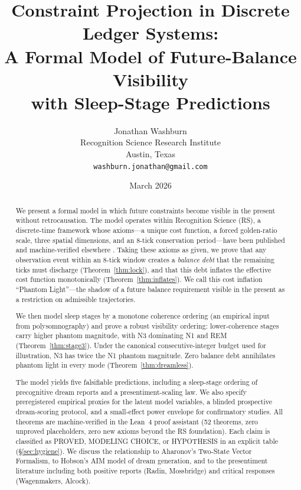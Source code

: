\documentclass[11pt, a4paper]{article}
\title{\textbf{Constraint Projection in Discrete Ledger Systems:\\
A Formal Model of Future-Balance Visibility\\
with Sleep-Stage Predictions}}
\author{Jonathan Washburn\\
Recognition Science Research Institute\\
Austin, Texas\\
\texttt{washburn.jonathan@gmail.com}}
\date{March 2026}
\theoremstyle{definition}
\theoremstyle{remark}
\begin{document}
\maketitle

\begin{abstract}
We present a formal model in which future constraints become visible
in the present without retrocausation. The model operates within
Recognition Science (RS), a discrete-time framework whose axioms---a
unique cost function, a forced golden-ratio scale, three spatial
dimensions, and an 8-tick conservation period---have been published
and machine-verified elsewhere \cite{RSAxioms2025,RSCost2025,
RSGeometry2025,RSdalembert2026}. Taking these axioms as given, we
prove that any observation event within an 8-tick window creates a
\emph{balance debt} that the remaining ticks must discharge
(Theorem~\ref{thm:lock}), and that this debt inflates the effective
cost function monotonically (Theorem~\ref{thm:inflates}). We call
this cost inflation ``Phantom Light''---the shadow of a future
balance requirement visible in the present as a restriction on
admissible trajectories.

We then model sleep stages by a monotone coherence ordering (an
empirical input from polysomnography) and prove a robust visibility
ordering: lower-coherence stages carry higher phantom magnitude, with
N3 dominating N1 and REM (Theorem~\ref{thm:stage3}). Under the
canonical consecutive-integer budget used for illustration, N3 has
twice the N1 phantom magnitude. Zero balance debt annihilates phantom
light in every mode (Theorem~\ref{thm:dreamless}).

The model yields five falsifiable predictions, including a
sleep-stage ordering of precognitive dream reports and a
presentiment-scaling law. We also specify preregistered empirical
proxies for the latent model variables, a blinded prospective
dream-scoring protocol, and a small-effect power envelope for
confirmatory studies. All theorems are machine-verified in the Lean~4
proof assistant (52 theorems, zero unproved placeholders, zero new
axioms beyond the RS foundation). Each claim is classified as PROVED,
MODELING CHOICE, or HYPOTHESIS in an explicit table
(\S\ref{sec:hygiene}). We discuss the relationship to
Aharonov's Two-State Vector Formalism, to Hobson's AIM model of
dream generation, and to the presentiment literature including
both positive reports (Radin, Mossbridge) and critical responses
(Wagenmakers, Alcock).
\end{abstract}
\end{document}
